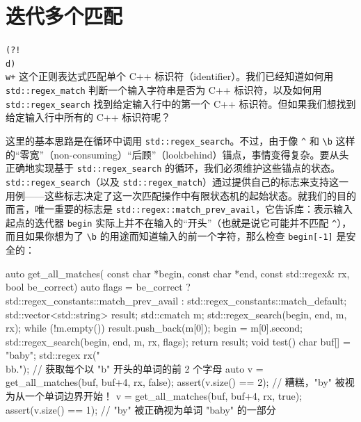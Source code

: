 \section{迭代多个匹配}

\texttt{(\allowbreak{}?!\\d)\allowbreak{}\\w+} 这个正则表达式匹配单个 C++ 标识符（identifier）。我们已经知道如何用 \texttt{std::\allowbreak{}regex\_\allowbreak{}match} 判断一个输入字符串是否为 C++ 标识符，以及如何用 \texttt{std::\allowbreak{}regex\_\allowbreak{}search} 找到给定输入行中的第一个 C++ 标识符。但如果我们想找到给定输入行中所有的 C++ 标识符呢？

这里的基本思路是在循环中调用 \texttt{std::\allowbreak{}regex\_\allowbreak{}search}。不过，由于像 \texttt{\textasciicircum{}} 和 \texttt{\textbackslash b} 这样的“零宽”（non-consuming）“后顾”（lookbehind）锚点，事情变得复杂。要从头正确地实现基于 \texttt{std::\allowbreak{}regex\_\allowbreak{}search} 的循环，我们必须维护这些锚点的状态。\texttt{std::\allowbreak{}regex\_\allowbreak{}search}（以及 \texttt{std::\allowbreak{}regex\_\allowbreak{}match}）通过提供自己的标志来支持这一用例——这些标志决定了这一次匹配操作中有限状态机的起始状态。就我们的目的而言，唯一重要的标志是 \texttt{std::\allowbreak{}regex::\allowbreak{}match\_\allowbreak{}prev\_\allowbreak{}avail}，它告诉库：表示输入起点的迭代器 \texttt{begin} 实际上并不在输入的“开头”（也就是说它可能并不匹配 \texttt{\textasciicircum{}}），而且如果你想为了 \texttt{\textbackslash b} 的用途而知道输入的前一个字符，那么检查 \texttt{begin[-1]} 是安全的：

\begin{codebox}[cpp]
    auto get_all_matches(
      const char *begin, const char *end,
      const std::regex& rx,
      bool be_correct)
    {
      auto flags = be_correct ?
      std::regex_constants::match_prev_avail :
      std::regex_constants::match_default;
      std::vector<std::string> result;
      std::cmatch m;
      std::regex_search(begin, end, m, rx);
      while (!m.empty()) {
        result.push_back(m[0]);
        begin = m[0].second;
        std::regex_search(begin, end, m, rx, flags);
      }
      return result;
    }
    void test() {
      char buf[] = "baby";
      std::regex rx("\\bb.");
        // 获取每个以 "b" 开头的单词的前 2 个字母
      auto v = get_all_matches(buf, buf+4, rx, false);
      assert(v.size() == 2);
        // 糟糕，"by" 被视为从一个单词边界开始！
      v = get_all_matches(buf, buf+4, rx, true);
      assert(v.size() == 1);
        // "by" 被正确视为单词 "baby" 的一部分
    }
\end{codebox}

